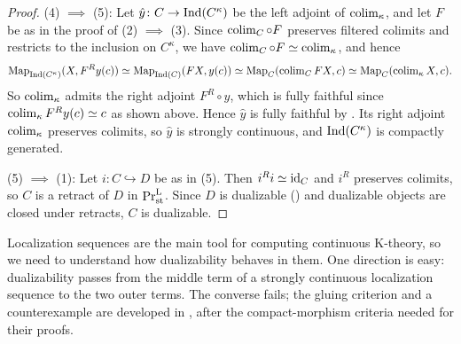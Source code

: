 \begin{proof}
		(4) $\implies$ (5): Let $\hat{y}\colon C \to \operatorname{Ind}(C^{\kappa})$ be the left adjoint of $\operatorname{colim}_{\kappa}$, and let $F$ be as in the proof of (2) $\implies$ (3). Since $\operatorname{colim}_C \circ F$ preserves filtered colimits and restricts to the inclusion on $C^{\kappa}$, we have $\operatorname{colim}_C \circ F \simeq \operatorname{colim}_{\kappa}$, and hence
		\[
			\operatorname{Map}_{\operatorname{Ind}(C^{\kappa})}(X,F^Ry(c)) \simeq \operatorname{Map}_{\operatorname{Ind}(C)}(FX,y(c)) \simeq \operatorname{Map}_C(\operatorname{colim}_C FX,c) \simeq \operatorname{Map}_C(\operatorname{colim}_{\kappa}X,c).
		\]
		So $\operatorname{colim}_{\kappa}$ admits the right adjoint $F^R \circ y$, which is fully faithful since $\operatorname{colim}_{\kappa}F^Ry(c) \simeq c$ as shown above. Hence $\hat{y}$ is fully faithful by . Its right adjoint $\operatorname{colim}_{\kappa}$ preserves colimits, so $\hat{y}$ is strongly continuous, and $\operatorname{Ind}(C^{\kappa})$ is compactly generated.

		(5) $\implies$ (1): Let $i\colon C \hookrightarrow D$ be as in (5). Then $i^R i \simeq \operatorname{id}_C$ and $i^R$ preserves colimits, so $C$ is a retract of $D$ in $\textup{Pr}^{\textup{L}}_{\operatorname{st}}$. Since $D$ is dualizable () and dualizable objects are closed under retracts, $C$ is dualizable.
	\end{proof}


	Localization sequences are the main tool for computing continuous K-theory, so we need to understand how dualizability behaves in them. One direction is easy: dualizability passes from the middle term of a strongly continuous localization sequence to the two outer terms. The converse fails; the gluing criterion and a counterexample are developed in , after the compact-morphism criteria needed for their proofs.

